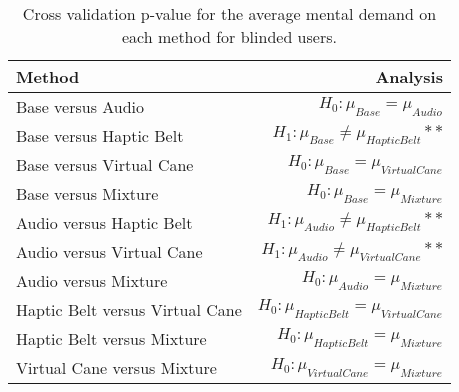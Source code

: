 
\begin{table}[!htb]
\centering
\caption{Cross validation p-value for the average mental demand on each method for blinded users.}
\label{tab:lsd_mental_demand_avg}
\begin{tabular}{lr}
\toprule
                         Method &                                       Analysis \\
\midrule
              Base versus Audio &               $H_0 : \mu_{Base} = \mu_{Audio}$ \\
        Base versus Haptic Belt &     $H_1 : \mu_{Base} \ne \mu_{Haptic Belt}**$ \\
       Base versus Virtual Cane &        $H_0 : \mu_{Base} = \mu_{Virtual Cane}$ \\
            Base versus Mixture &             $H_0 : \mu_{Base} = \mu_{Mixture}$ \\
       Audio versus Haptic Belt &    $H_1 : \mu_{Audio} \ne \mu_{Haptic Belt}**$ \\
      Audio versus Virtual Cane &   $H_1 : \mu_{Audio} \ne \mu_{Virtual Cane}**$ \\
           Audio versus Mixture &            $H_0 : \mu_{Audio} = \mu_{Mixture}$ \\
Haptic Belt versus Virtual Cane & $H_0 : \mu_{Haptic Belt} = \mu_{Virtual Cane}$ \\
     Haptic Belt versus Mixture &      $H_0 : \mu_{Haptic Belt} = \mu_{Mixture}$ \\
    Virtual Cane versus Mixture &     $H_0 : \mu_{Virtual Cane} = \mu_{Mixture}$ \\
\bottomrule
\end{tabular}
\end{table}

